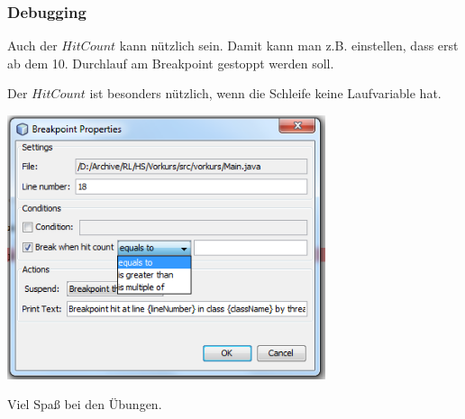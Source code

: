 \documentclass[final]{beamer}
\begin{document}
\begin{frame}
	\frametitle{Debugging}
	Auch der $Hit Count$ kann nützlich sein. Damit kann man z.B. einstellen, dass erst
	ab dem 10. Durchlauf am Breakpoint gestoppt werden soll.

	Der $Hit Count$ ist besonders nützlich, wenn die Schleife keine Laufvariable hat.

	\begin{center}
	\includegraphics[width=0.7\textwidth]{breakpoint_hitcount}
	\end{center}
\end{frame}

\begin{frame}
	\begin{center}
	\vfill
	\Huge{Viel Spaß bei den Übungen.}
	\vfill
	\end{center}
\end{frame}
\end{document}
